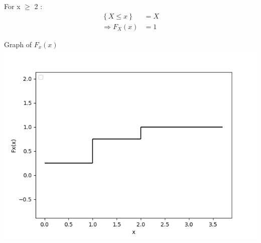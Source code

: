 \documentclass{beamer}
\providecommand{\cbrak}[1]{\ensuremath{\left\{#1\right\}}}
\begin{document}
\begin{frame}
For x $\geq$ 2 :
\begin{align}
\cbrak{X \leq x} & = X \\ \Rightarrow F_X(x)& = 1
\end{align}

\end{frame}

\begin{frame}{Graph of $F_x(x)$}
        \centering
        \includegraphics[height=0.8\paperheight]{images/image9.png}     
\end{frame}
\end{document}
